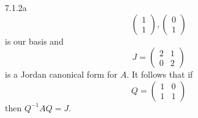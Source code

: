 \documentclass{exam}
\begin{document}
\begin{problem}{7.1.2a}
\[{\begin{pmatrix}
          1 \\ 1
        \end{pmatrix},
        \begin{pmatrix}
          0 \\ 1
        \end{pmatrix}
      }
    \]
    is our basis and 
    \[
        J = \begin{pmatrix}
          2 & 1 \\
          0 & 2
        \end{pmatrix}
    \]
    is a Jordan canonical form for $A$. It follows that if 
    \[
        Q = \begin{pmatrix}
          1 & 0 \\
          1 & 1 
        \end{pmatrix}
    \]
    then $Q^{-1}AQ = J$.
  \end{problem}
\end{document}
